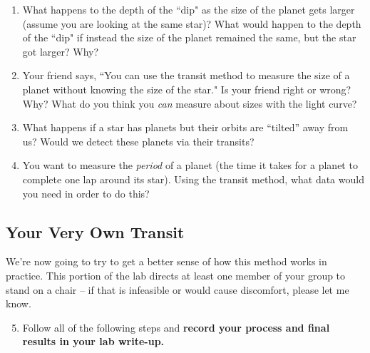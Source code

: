 \documentclass[12pt]{article}
\begin{document}
\begin{enumerate}
    \item What happens to the depth of the ``dip" as the size of the planet gets larger (assume you are looking at the same star)? What would happen to the depth of the ``dip" if instead the size of the planet remained the same, but the star got larger?  Why?
    
    \item Your friend says, ``You can use the transit method to measure the size of a planet without knowing the size of the star." Is your friend right or wrong? Why? What do you think you \textit{can} measure about sizes with the light curve?
    
    \item What happens if a star has planets but their orbits are “tilted” away from us? Would we detect these planets via their transits?
    
    \item You want to measure the \textit{period} of a planet (the time it takes for a planet to complete one lap around its star). Using the transit method, what data would you need in order to do this?
    
\end{enumerate}

\subsection{Your Very Own Transit}
\noindent
We’re now going to try to get a better sense of how this method works in practice. This portion of the lab directs at least one member of your group to stand on a chair -- if that is infeasible or would cause discomfort, please let me know.  

\begin{enumerate}
\setcounter{enumi}{4}
    \item Follow all of the following steps and \textbf{record your process and final results in your lab write-up.}
\end{enumerate}
\end{document}
